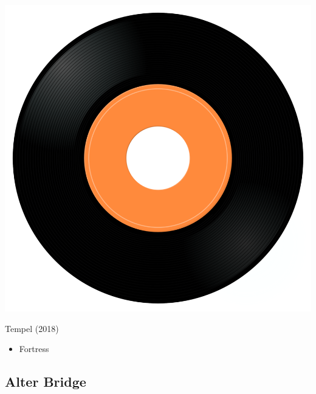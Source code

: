 \begin{minipage}[t]{0.25\textwidth}\vspace{0pt}
\captionsetup{type=figure}
\includegraphics[width=\textwidth]{Images/cover.png}
\caption*{Tempel (2018)}
\end{minipage}
\begin{minipage}[t]{0.25\textwidth}\vspace{0pt}
\begin{itemize}[nosep,leftmargin=1em,labelwidth=*,align=left]
	\setlength{\itemsep}{0pt}
	\item Fortress
\end{itemize}
\end{minipage}

\subsection{Alter Bridge}

